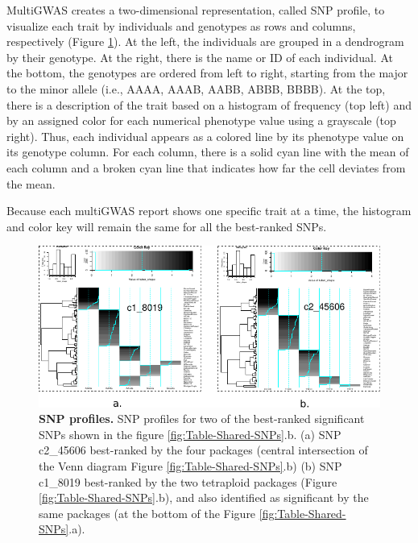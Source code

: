 \documentclass{article}
\begin{document}
MultiGWAS creates a two-dimensional representation, called SNP profile,
to visualize each trait by individuals and genotypes as rows and columns,
respectively (Figure \ref{fig:SNP-profiles}). At the left, the individuals
are grouped in a dendrogram by their genotype. At the right, there
is the name or ID of each individual. At the bottom, the genotypes
are ordered from left to right, starting from the major to the minor
allele (i.e., AAAA, AAAB, AABB, ABBB, BBBB). At the top, there is
a description of the trait based on a histogram of frequency (top
left) and by an assigned color for each numerical phenotype value
using a grayscale (top right). Thus, each individual appears as a
colored line by its phenotype value on its genotype column. For each
column, there is a solid cyan line with the mean of each column and
a broken cyan line that indicates how far the cell deviates from the
mean.

Because each multiGWAS report shows one specific trait at a time,
the histogram and color key will remain the same for all the best-ranked
SNPs.

\begin{figure}[H]
\begin{centering}
\includegraphics{images/paper-heat-maps}
\par\end{centering}
\caption{\textbf{\scriptsize{}SNP profiles. }{\scriptsize{}SNP profiles for
two of the best-ranked significant SNPs shown in the figure \ref{fig:Table-Shared-SNPs}.b.
(a) SNP c2\_45606 best-ranked by the four packages (central intersection
of the Venn diagram Figure \ref{fig:Table-Shared-SNPs}.b) (b) SNP
c1\_8019 best-ranked by the two tetraploid packages (Figure \ref{fig:Table-Shared-SNPs}.b),
and also identified as significant by the same packages (at the bottom
of the Figure \ref{fig:Table-Shared-SNPs}.a). \label{fig:SNP-profiles}}}
\end{figure}
\end{document}
